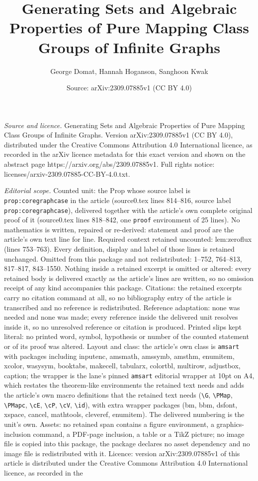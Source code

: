 \documentclass[10pt,a4paper]{amsart}
\title[Generating Sets and Algebraic Properties of Pure Mapping Cla]{Generating Sets and Algebraic Properties of Pure Mapping Class Groups of Infinite Graphs}
\author{George Domat, Hannah Hoganson, Sanghoon Kwak}
\date{Source: arXiv:2309.07885v1 (CC BY 4.0)}
\begin{document}
\maketitle

\noindent\emph{Source and licence.} Generating Sets and Algebraic Properties of Pure Mapping Class Groups of Infinite Graphs. Version arXiv:2309.07885v1 (CC BY 4.0), distributed under the Creative Commons Attribution 4.0 International licence, as recorded in the arXiv licence metadata for this exact version and shown on the abstract page https://arxiv.org/abs/2309.07885v1. Full rights notice: licenses/arxiv-2309.07885-CC-BY-4.0.txt.\par\smallskip

\noindent\textit{Editorial scope.} Counted unit: the Prop whose source label is \texttt{prop:coregraphcase} in the article (source0.tex lines 814--816, source label \texttt{prop:coregraphcase}), delivered together with the article's own complete original proof of it (source0.tex lines 818--842, one \texttt{proof} environment of 25 lines). No mathematics is written, repaired or re-derived: statement and proof are the article's own text line for line. Required context retained uncounted: lem:zeroflux (lines 753--763). Every definition, display and label of those lines is retained unchanged. Omitted from this package and not redistributed: 1--752, 764--813, 817--817, 843--1550. Nothing inside a retained excerpt is omitted or altered: every retained body is delivered exactly as the article's lines are written, so no omission receipt of any kind accompanies this package. Citations: the retained excerpts carry no citation command at all, so no bibliography entry of the article is transcribed and no reference is redistributed. Reference adaptation: none was needed and none was made; every reference inside the delivered unit resolves inside it, so no unresolved reference or citation is produced. Printed slips kept literal: no printed word, symbol, hypothesis or number of the counted statement or of its proof was altered. Layout and class: the article's own class is \texttt{amsart} with packages including inputenc, amsmath, amssymb, amsthm, enumitem, xcolor, wasysym, booktabs, makecell, tabularx, colortbl, multirow, adjustbox, caption; the wrapper is the lane's pinned \texttt{amsart} editorial wrapper at 10pt on A4, which restates the theorem-like environments the retained text needs and adds the article's own macro definitions that the retained text needs (\texttt{\textbackslash G}, \texttt{\textbackslash PMap}, \texttt{\textbackslash PMapc}, \texttt{\textbackslash cE}, \texttt{\textbackslash cP}, \texttt{\textbackslash cV}, \texttt{\textbackslash id}), with extra wrapper packages (bm, bbm, dsfont, xspace, cancel, mathtools, cleveref, enumitem). The delivered numbering is the unit's own. Assets: no retained span contains a figure environment, a graphics-inclusion command, a PDF-page inclusion, a table or a TikZ picture; no image file is copied into this package, the package declares no asset dependency and no image file is redistributed with it. Licence: version arXiv:2309.07885v1 of this article is distributed under the Creative Commons Attribution 4.0 International licence, as recorded in the 
\end{document}
